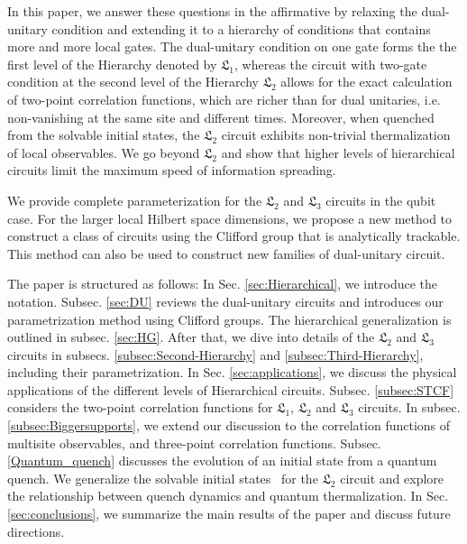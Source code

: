 \documentclass[aps,prx,twocolumn,notitlepage,nofootinbib,nobalancelastpage]{revtex4-2}
\theoremstyle{break}
\newcommand{\1}{\mathbbm{1}}
\theoremstyle{plain}
\theoremstyle{plain}
\theoremstyle{plain}
\begin{document}
In this paper, we answer these questions in the affirmative by relaxing the dual-unitary condition and extending it %
to a hierarchy of conditions that contains more and more local gates.
The dual-unitary condition on one gate forms the the first level of the Hierarchy denoted by $\mathfrak{L}_1$, whereas the circuit with two-gate condition at the second level of the Hierarchy $\mathfrak{L}_2$ allows for the exact calculation of two-point correlation functions, which are richer than for dual unitaries, i.e. non-vanishing at the same site and different times.
Moreover, when quenched from the solvable initial states, the $\mathfrak{L}_2$ circuit exhibits non-trivial thermalization of local observables. %
We go beyond $\mathfrak{L}_2$ and show that higher levels of hierarchical circuits limit the maximum speed of information spreading. 

We provide complete parameterization for the $\mathfrak{L}_2$ and $\mathfrak{L}_3$ circuits in the qubit case. For the larger local Hilbert space dimensions, we propose a new method to construct a class of circuits using the Clifford group that is analytically trackable. This method can also be used to construct new families of dual-unitary circuit. 

The paper is structured as follows: In Sec. \ref{sec:Hierarchical}, we introduce the notation. Subsec. \ref{sec:DU} reviews the dual-unitary circuits and introduces our parametrization method using Clifford groups. The hierarchical generalization is outlined in subsec. \ref{sec:HG}. After that, we dive into details of the $\mathfrak{L}_2$ and $\mathfrak{L}_3$ circuits in subsecs. \ref{subsec:Second-Hierarchy} and \ref{subsec:Third-Hierarchy}, including their parametrization. In Sec. \ref{sec:applications}, we discuss the physical applications of the different levels of Hierarchical circuits. Subsec. \ref{subsec:STCF} considers the two-point correlation functions for $\mathfrak{L}_1$, $\mathfrak{L}_2$ and $\mathfrak{L}_3$ circuits. In subsec. \ref{subsec:Biggersupports}, we extend our discussion to the correlation functions of multisite observables, and three-point correlation functions. Subsec. \ref{Quantum_quench} discusses the evolution of an initial state from a quantum quench. We generalize the solvable initial states~\cite{piroli2020exact} for the $\mathfrak{L}_2$ circuit and explore the relationship between quench dynamics and quantum thermalization. In Sec. \ref{sec:conclusions}, we summarize the main results of the paper and discuss future directions.
\end{document}
